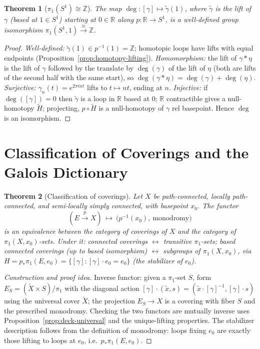 \documentclass[11pt,a4paper]{article}
\newtheorem{theorem}{Theorem}[section]
\theoremstyle{definition}
\newcommand{\Z}{\mathbb{Z}}
\newcommand{\R}{\mathbb{R}}
\begin{document}
	\begin{theorem}[$\pi_1(S^1)\cong\Z$]\label{thm:pi1-S1}
		The map $\deg:[\gamma]\mapsto\tilde\gamma(1)$, where $\tilde\gamma$ is the lift of $\gamma$ (based at
		$1\in S^1$) starting at $0\in\R$ along $p:\R\to S^1$, is a well-defined group isomorphism
		$\pi_1(S^1,1)\xrightarrow{\ \cong\ }\Z$.
	\end{theorem}
	\begin{proof}
		\emph{Well-defined:} $\tilde\gamma(1)\in p^{-1}(1)=\Z$; homotopic loops have lifts with equal
		endpoints (Proposition~\ref{prop:homotopy-lifting}). \emph{Homomorphism:} the lift of $\gamma*\eta$
		is the lift of $\gamma$ followed by the translate by $\deg(\gamma)$ of the lift of $\eta$ (both are
		lifts of the second half with the same start), so $\deg(\gamma*\eta)=\deg(\gamma)+\deg(\eta)$.
		\emph{Surjective:} $\gamma_n(t)=e^{2\pi i n t}$ lifts to $t\mapsto nt$, ending at $n$.
		\emph{Injective:} if $\deg([\gamma])=0$ then $\tilde\gamma$ is a loop in $\R$ based at $0$; $\R$
		contractible gives a null-homotopy $\tilde H$; projecting, $p\circ\tilde H$ is a null-homotopy of
		$\gamma$ rel basepoint. Hence $\deg$ is an isomorphism.
	\end{proof}
	
	\section{Classification of Coverings and the Galois Dictionary}
	
	\begin{theorem}[Classification of coverings]\label{thm:classification}
		Let $X$ be path-connected, locally path-connected, and semi-locally simply connected, with basepoint
		$x_0$. The functor
		\[
		(E\xrightarrow{p} X)\ \longmapsto\ \big(p^{-1}(x_0),\ \text{monodromy}\big)
		\]
		is an equivalence between the category of coverings of $X$ and the category of $\pi_1(X,x_0)$-sets.
		Under it: connected coverings $\leftrightarrow$ transitive $\pi_1$-sets; based connected coverings
		(up to based isomorphism) $\leftrightarrow$ subgroups of $\pi_1(X,x_0)$, via
		$H=p_*\pi_1(E,e_0)=\{[\gamma]:[\gamma]\cdot e_0=e_0\}$ (the stabilizer of $e_0$).
	\end{theorem}
	\begin{proof}[Construction and proof idea]
		Inverse functor: given a $\pi_1$-set $S$, form $E_S=(\tilde X\times S)/\pi_1$ with the diagonal action
		$[\gamma]\cdot(\tilde x,s)=(\tilde x\cdot[\gamma]^{-1},[\gamma]\cdot s)$ using the universal cover
		$\tilde X$; the projection $E_S\to X$ is a covering with fiber $S$ and the prescribed monodromy.
		Checking the two functors are mutually inverse uses Proposition~\ref{prop:deck-universal} and the
		unique-lifting properties. The stabilizer description follows from the definition of monodromy:
		loops fixing $e_0$ are exactly those lifting to loops at $e_0$, i.e.\ $p_*\pi_1(E,e_0)$.
	\end{proof}
	
\end{document}
